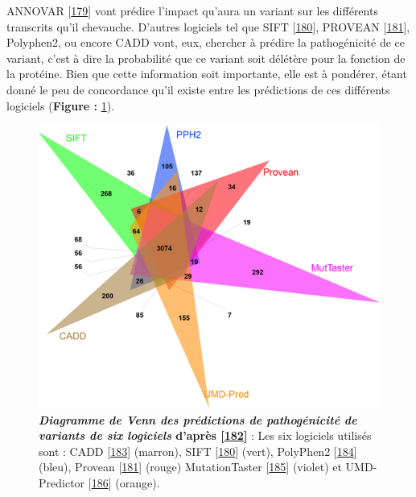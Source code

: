 \documentclass[12pt,a4paper,twoside]{ugathesis}
\theoremstyle{definition}
\theoremstyle{definition}
\theoremstyle{definition}
\theoremstyle{remark}
\begin{document}
\begin{enumerate}
\begin{enumerate}
    ANNOVAR {[}\protect\hyperlink{ref-Wang2010}{179}{]} vont prédire
    l'impact qu'aura un variant sur les différents transcrits qu'il
    chevauche. D'autres logiciels tel que SIFT
    {[}\protect\hyperlink{ref-Kumar2009}{180}{]}, PROVEAN
    {[}\protect\hyperlink{ref-Choi2012}{181}{]}, Polyphen2, ou encore
    CADD vont, eux, chercher à prédire la pathogénicité de ce variant,
    c'est à dire la probabilité que ce variant soit délétère pour la
    fonction de la protéine. Bien que cette information soit importante,
    elle est à pondérer, étant donné le peu de concordance qu'il existe
    entre les prédictions de ces différents logiciels (\textbf{Figure :}
    \ref{fig:pictvennpred}).
  \end{enumerate}
\end{enumerate}

\begin{figure}

{\centering \includegraphics[scale=.7]{figure/venn_Diag_patho_pred} 

}

\caption[Diagramme de Venn des prédictions de pathogénicité de variants de six logiciels]{\textbf{\emph{Diagramme de Venn des prédictions de
pathogénicité de variants de six logiciels} d'après
{[}\protect\hyperlink{ref-Salgado2016}{182}{]}} : Les six logiciels
utilisés sont : CADD {[}\protect\hyperlink{ref-Kircher2014}{183}{]}
(marron), SIFT {[}\protect\hyperlink{ref-Kumar2009}{180}{]} (vert),
PolyPhen2 {[}\protect\hyperlink{ref-Adzhubei2010}{184}{]} (bleu),
Provean {[}\protect\hyperlink{ref-Choi2012}{181}{]} (rouge)
MutationTaster {[}\protect\hyperlink{ref-Schwarz2010}{185}{]} (violet)
et UMD-Predictor {[}\protect\hyperlink{ref-Salgado2016a}{186}{]}
(orange).}\label{fig:pictvennpred}
\end{figure}
\end{document}
